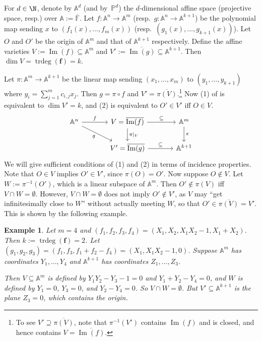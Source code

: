 \documentclass{toc}
\newtheorem{exmp}{Example}
\newcommand{\F}{\mathbb{F}}
\newcommand{\aff}{\mathbb{A}}
\newcommand{\proj}{\mathbb{P}}
\DeclareMathOperator{\im}{\mathrm{Im}}
\DeclareMathOperator{\trdeg}{\mathrm{trdeg}}
\newcommand{\ol}[1]{\overline{#1}}
\begin{document}
For $d\in\N$, denote by $\aff^d$
%
(and by~$\proj^d$)
the $d$-dimensional affine space
%
(projective space, resp.) over $\aff:=\ol{\F}$.
Let $f: \aff^n\to \aff^m$ (resp.~$g: \aff^n\to \aff^{k+1}$)
be the polynomial map sending $x$ to $(f_1(x),\dots,f_m(x))$
(resp.~$(g_1(x),\dots,g_{k+1}(x))$). Let $O$ and $O'$ be the
origin of $\aff^m$ and that of $\aff^{k+1}$ respectively.
Define the affine varieties $V:= \overline{\im(f)}\subseteq \aff^m$
and $V':= \overline{\im(g)}\subseteq \aff^{k+1}$. 
Then $\dim V= \trdeg(\mathbf f) = k$.

Let $\pi: \aff^m\to \aff^{k+1}$ be the linear map sending $(x_1,\dots,x_m)$ to $(y_1,\dots,y_{k+1})$ where $y_i= \sum_{j=1}^m c_{i,j} x_j$.
Then $g= \pi\circ f$ and $V'= \overline{\pi(V)}$.\footnote{To see $V'\supseteq\overline{\pi(V)}$, note that $\pi^{-1}(V')$ contains $\im(f)$ and is closed, and hence contains $V=\overline{\im(f)}$.}
 Now (1) of   is equivalent to $\dim V'=k$, and (2) is equivalent to $O'\in V'$ iff  $O\in V$.
\[
\begin{tikzcd}[column sep=large]
\aff^n \arrow{r}{f} \arrow[swap]{rd}{g}
& V= \overline{\im(f)}  \arrow{r}{\subseteq} \arrow{d}{\pi|_V} & \aff^m \arrow{d}{\pi}\\
& V'= \overline{\im(g)} \arrow{r}{\subseteq} & \aff^{k+1}
\end{tikzcd}
\] 
 We will give sufficient conditions of (1) and (2) in terms of incidence properties.
 Note that $O\in V$ implies $O'\in V'$, since $\pi(O)=O'$. Now suppose $O\not\in V$. Let $W:= \pi^{-1}(O')$, which is a linear  subspace of $\aff^m$.
  Then $O'\not\in \pi(V)$ iff $V\cap W=\emptyset$. However, $V\cap W=\emptyset$ does not imply $O'\not\in V'$, as $V$ may  ``get infinitesimally close to $W$''  without actually meeting $W$, so that $O'\in\overline{\pi(V)}=V'$. This is shown by the following 
   example. %

  
    \begin{exmp}\label{exmp_reduction}
Let $m=4$ and $(f_1,f_2,f_3,f_4)=(X_1,X_2,X_1 X_2-1, X_1+X_2)$. Then $k:=\trdeg(\mathbf f)= 2$.
  Let $(g_1,g_2,g_3)=(f_1,f_3,f_1+f_2-f_4)=(X_1,X_1 X_2-1,0)$.
  Suppose $\aff^m$ has coordinates $Y_1,\dots,Y_4$ and $\aff^{k+1}$ has coordinates $Z_1,\dots,Z_3$.

Then $V\subseteq\aff^m$ is defined by $Y_1Y_2-Y_3-1=0$ and $Y_1+Y_2-Y_4=0$, and $W$ is defined by $Y_1=0$, $Y_3=0$, and $Y_2-Y_4=0$.
So $V\cap W=\emptyset$.  But $V'\subseteq\aff^{k+1}$ is the plane $Z_3=0$, which contains the origin.
  \end{exmp}
  
\end{document}
